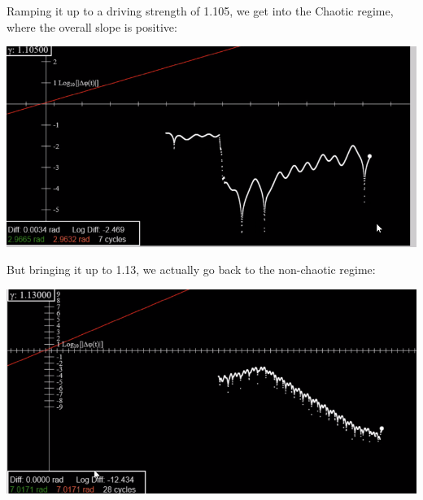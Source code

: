 Ramping it up to a driving strength of 1.105, we get into the Chaotic regime, where the overall slope is positive:
\begin{center}
    \includegraphics[scale=0.7]{Lecture-33/l33-img7.png}    
\end{center}
But bringing it up to 1.13, we actually go back to the non-chaotic regime:
\begin{center}
    \includegraphics[scale=0.7]{Lecture-33/l33-img8.png}    
\end{center}

